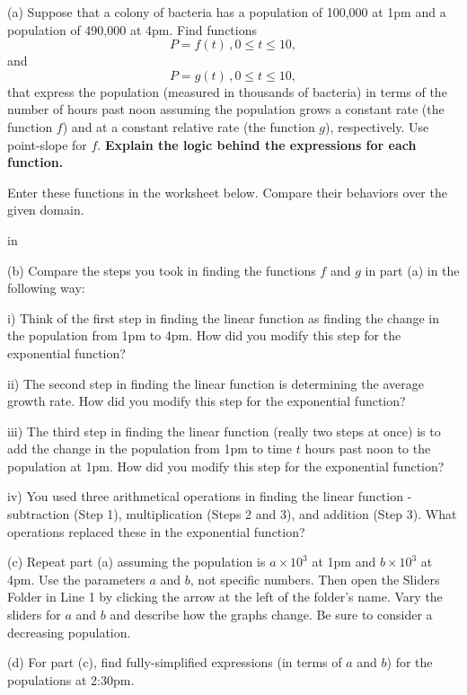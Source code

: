 \documentclass{ximera}
\newcommand{\pskip}{\vskip 0.1 in}
\begin{document}
\begin{question}   \label{Q22:ExponentialG}
(a) Suppose that a colony of bacteria has a population of 100,000 at 1pm and a population of 490,000 at 4pm. Find functions 
\[
   P = f(t) \, , 0\leq t \leq 10 ,
\]
and 
\[
   P = g(t) \, , 0\leq t \leq 10 ,
\]
that express the population (measured in thousands of bacteria) in terms of the number of hours past noon assuming the population grows a constant rate (the function $f$) and at a constant relative rate (the function $g$), respectively. Use point-slope for $f$. {\bf Explain the logic behind the expressions for each function.}

Enter these functions in the worksheet below. Compare their behaviors over the given domain.

 
\begin{onlineOnly}
    \begin{center}
\end{center}
\end{onlineOnly}

\pskip

(b) Compare the steps  you took in finding the functions $f$ and $g$ in part (a) in the following way:

i) Think of the first step in finding the linear function as finding the change in the population from 1pm to 4pm. How did you modify this step for the exponential function?

ii) The second step in finding the linear function is determining the average growth rate. How did you modify this step for the exponential function?

iii) The third step in finding the linear function (really two steps at once) is to add the change in the population from 1pm to time $t$ hours past noon to the population at 1pm. How did you modify this step for the exponential function?

iv) You used three arithmetical operations in finding the linear function - subtraction (Step 1), multiplication (Steps 2 and 3), and addition (Step 3). What operations replaced these in the exponential function?



(c) Repeat part (a) assuming the population is $a\times 10^3$ at 1pm and $b\times 10^3$ at 4pm. Use the parameters $a$ and $b$, not specific numbers. Then open the Sliders Folder in Line 1 by clicking the arrow at the left of the folder's name. Vary the sliders for $a$ and $b$ and describe how the graphs change. Be sure to consider a decreasing population.


(d) For part (c), find fully-simplified expressions (in terms of $a$ and $b$) for the populations at 2:30pm.

\end{question}
\end{document}
